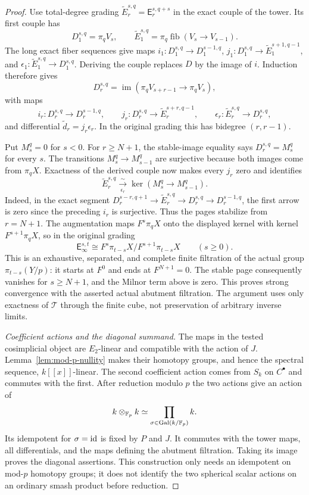 \begin{proof}
Use total-degree grading
$\widetilde E_r^{s,q}=\mathsf E_r^{s,q+s}$ in the exact couple of the tower.
Its first couple has
\[
 D_1^{s,q}=\pi_qV_s,\qquad
 \widetilde E_1^{s,q}=
   \pi_q\operatorname{fib}(V_s\longrightarrow V_{s-1}).
\]
The long exact fiber sequences give maps $i_1:D_1^{s,q}\to D_1^{s-1,q}$,
$j_1:D_1^{s,q}\to\widetilde E_1^{s+1,q-1}$, and
$\epsilon_1:\widetilde E_1^{s,q}\to D_1^{s,q}$.
Deriving the couple replaces $D$ by the image of $i$.  Induction therefore
gives
\[
 D_r^{s,q}=\operatorname{im}(\pi_qV_{s+r-1}\longrightarrow\pi_qV_s),
\]
with maps
\[
 i_r:D_r^{s,q}\to D_r^{s-1,q},\qquad
 j_r:D_r^{s,q}\to\widetilde E_r^{s+r,q-1},\qquad
 \epsilon_r:\widetilde E_r^{s,q}\to D_r^{s,q},
\]
and differential $\widetilde d_r=j_r\epsilon_r$.  In the original grading
this has bidegree $(r,r-1)$.

Put $M_s^q=0$ for $s<0$.  For $r\ge N+1$, the stable-image equality
says $D_r^{s,q}=M_s^q$ for every $s$.  The transitions $M_s^q\to M_{s-1}^q$
are surjective because both images come from $\pi_qX$.  Exactness of the
derived couple now makes every $j_r$ zero and identifies
\[
 \widetilde E_r^{s,q}\xrightarrow[\epsilon_r]{\ \sim\ }
       \ker(M_s^q\longrightarrow M_{s-1}^q).
\]
Indeed, in the exact segment
$D_r^{s-r,q+1}\to\widetilde E_r^{s,q}\to D_r^{s,q}\to D_r^{s-1,q}$,
the first arrow is zero since the preceding $i_r$ is surjective.
Thus the pages stabilize from $r=N+1$.  The augmentation maps
$F^s\pi_qX$ onto the displayed kernel with kernel $F^{s+1}\pi_qX$,
so in the original grading
\[
 \mathsf E_\infty^{s,t}
    \cong F^s\pi_{t-s}X/F^{s+1}\pi_{t-s}X\qquad(s\ge0).
\]
This is an exhaustive, separated, and complete finite filtration of the
actual group $\pi_{t-s}(Y/p)$: it starts at $F^0$ and ends at $F^{N+1}=0$.
The stable page consequently vanishes for $s\ge N+1$, and the Milnor term
above is zero.  This proves strong convergence with the asserted actual
abutment filtration.  The argument uses only exactness of $\mathcal T$
through the finite cube, not preservation of arbitrary inverse limits.

\smallskip\noindent\emph{Coefficient actions and the diagonal summand.}
The maps in the tested cosimplicial object are $E_2$-linear and
compatible with the action of $J$.  Lemma~\ref{lem:mod-p-nullity}
makes their homotopy groups, and hence the spectral sequence,
$k[[x]]$-linear.  The second coefficient action comes from $S_k$ on
$C^\bullet$ and commutes with the first.  After reduction modulo $p$
the two actions give an action of
\[
  k\otimes_{\mathbb F_p}k\simeq
          \prod_{\sigma\in\operatorname{Gal}(k/\mathbb F_p)}k.
\]
Its idempotent for $\sigma=\operatorname{id}$ is fixed by $P$ and $J$.  It commutes
with the tower maps, all differentials, and the maps defining the
abutment filtration.  Taking its image proves the diagonal assertions.
This construction only needs an idempotent on mod-$p$ homotopy groups;
it does not identify the two spherical scalar actions on an ordinary
smash product before reduction.
\end{proof}

